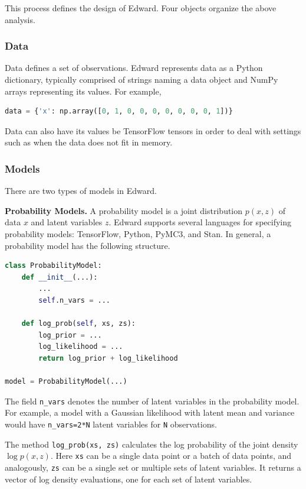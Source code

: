 This process defines the design of Edward. Four objects organize the
above analysis.

\subsubsection{Data}

Data defines a set of observations. Edward represents
data as a Python dictionary, typically comprised of strings naming a
data object and NumPy arrays representing its values. For example,

\begin{lstlisting}[language=Python]
data = {'x': np.array([0, 1, 0, 0, 0, 0, 0, 0, 0, 1])}
\end{lstlisting}

Data can also have its values be TensorFlow tensors in order
to deal with settings such as when the data does not fit in memory.

\subsubsection{Models}\label{models}

There are two types of models in Edward.

\textbf{Probability Models.}
A probability model is a joint distribution $p(x, z)$ of data $x$ and latent
variables $z$.
Edward supports several languages for specifying probability models:
TensorFlow, Python, PyMC3, and Stan. In general, a probability model
has the following structure.
\begin{lstlisting}[language=Python]
class ProbabilityModel:
    def __init__(...):
        ...
        self.n_vars = ...

    def log_prob(self, xs, zs):
        log_prior = ...
        log_likelihood = ...
        return log_prior + log_likelihood

model = ProbabilityModel(...)
\end{lstlisting}
The field \texttt{n\_vars} denotes the number of latent variables in the
probability model. For example, a model with a Gaussian likelihood with latent
mean and variance would have \texttt{n\_vars=2*N} latent variables for
\texttt{N} observations.

The method \texttt{log_prob(xs, zs)} calculates the log probability of
the joint density $\log p(x,z)$. Here \texttt{xs} can be a single data
point or a batch of data points, and analogously, \texttt{zs} can be a
single set or multiple sets of latent variables. It returns a vector
of log density evaluations, one for each set of latent variables.

